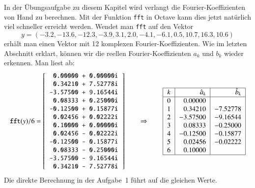 In der Übungsaufgabe zu diesem Kapitel wird verlangt die
Fourier-Koeffizienten von Hand zu berechnen.
Mit der Funktion \texttt{fft} in Octave kann dies jetzt natürlich viel
schneller erreicht werden.
Wendet man \texttt{fft} auf den Vektor
\[
y = (-3.2, -13.6, -12.3, -3.9, 3.1, 2.0, -4.1, -6.1, 0.5, 10.7, 16.3, 10.6 )
\]
erhält man einen Vektor mit 12 komplexen Fourier-Koeffizienten.
Wie im letzten Abschnitt erklart, können wir die reellen Fourier-Koeffizienten
$a_k$ und $b_k$ wieder erkennen.
Man liest ab:
\[
\texttt{fft}(y) / 6
=
\left[
\begin{tabular}{>{\tt}r}
   0.00000 + 0.00000i\\
   0.34210 + 7.52778i\\
  -3.57500 + 9.16544i\\
   0.08333 + 0.25000i\\
  -0.12500 + 0.15877i\\
   0.02456 + 0.02222i\\
   0.10000 + 0.00000i\\
   0.02456 - 0.02222i\\
  -0.12500 - 0.15877i\\
   0.08333 - 0.25000i\\
  -3.57500 - 9.16544i\\
   0.34210 - 7.52778i
\end{tabular}
\right]
\qquad\Rightarrow\qquad
\begin{tabular}{|>{$}c<{$}|>{$}r<{$}|>{$}r<{$}|}
\hline
k     &\hat{a}_k&\hat{b}_k\\
\hline
0     & 0.00000&        \\
1     & 0.34210&-7.52778\\
2     &-3.57500&-9.16544\\
3     & 0.08333&-0.25000\\
4     &-0.12500&-0.15877\\
5     & 0.02456&-0.02222\\
6     & 0.10000&        \\
\hline
\end{tabular}
\]
Die direkte Berechnung in der Aufgabe~1 führt auf die gleichen Werte.




